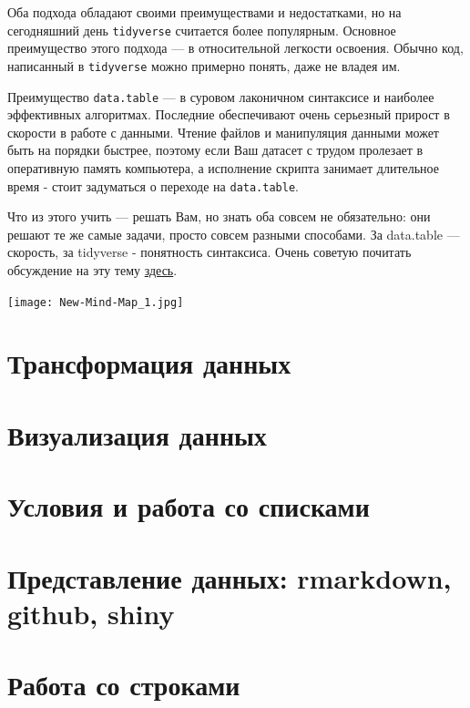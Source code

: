 \documentclass[]{book}
\begin{document}
Оба подхода обладают своими преимуществами и недостатками, но на сегодняшний день \texttt{tidyverse} считается более популярным. Основное преимущество этого подхода --- в относительной легкости освоения. Обычно код, написанный в \texttt{tidyverse} можно примерно понять, даже не владея им.

Преимущество \texttt{data.table} --- в суровом лаконичном синтаксисе и наиболее эффективных алгоритмах. Последние обеспечивают очень серьезный прирост в скорости в работе с данными. Чтение файлов и манипуляция данными может быть на порядки быстрее, поэтому если Ваш датасет с трудом пролезает в оперативную память компьютера, а исполнение скрипта занимает длительное время - стоит задуматься о переходе на \texttt{data.table}.

Что из этого учить --- решать Вам, но знать оба совсем не обязательно: они решают те же самые задачи, просто совсем разными способами. За data.table --- скорость, за tidyverse - понятность синтаксиса. Очень советую почитать обсуждение на эту тему \href{https://stackoverflow.com/questions/21435339/data-table-vs-dplyr-can-one-do-something-well-the-other-cant-or-does-poorly}{здесь}.

\texttt{[image: New-Mind-Map\_1.jpg]}

\hypertarget{tidy_dplyr}{%
\chapter{Трансформация данных}\label{tidy_dplyr}}

\hypertarget{viz_1}{%
\chapter{Визуализация данных}\label{viz_1}}

\hypertarget{dplyr_purr}{%
\chapter{Условия и работа со списками}\label{dplyr_purr}}

\hypertarget{data_presentation}{%
\chapter{Представление данных: rmarkdown, github, shiny}\label{data_presentation}}

\hypertarget{strings}{%
\chapter{Работа со строками}\label{strings}}
\end{document}

